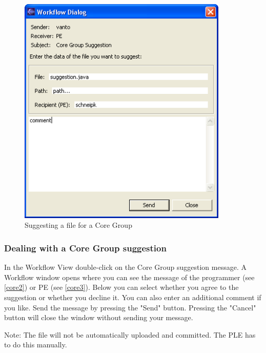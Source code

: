 \begin{figure}[h!]
\begin{center}
\includegraphics[width=10cm]{core1.png}
   \caption{Suggesting a file for a Core Group}
\label{core1}
\end{center}
\end{figure}\par

\subsubsection{Dealing with a Core Group suggestion}

In the Workflow View double-click on the Core Group suggestion message. A Workflow
window opens where you can see the message of the programmer (see \ref{core2}) or PE (see \ref{core3}). Below you
can select whether you agree to the suggestion or whether you decline it. You can also
enter an additional comment if you like. Send the message by pressing the "Send" 
button. Pressing the "Cancel" button will close the window without sending 
your message.\par
Note: The file will not be automatically uploaded and committed. The PLE has to do
this manually.

